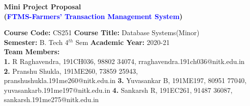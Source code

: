 \documentclass[12pt]{article}
\begin{document}


\begin{center}
    \textbf{\Large{Mini Project Proposal \\
    (\textcolor{blue}{FTMS-Farmers' Transaction Management System})}}
\end{center}

\noindent 
\textbf{Course Code:} CS251 
\hspace{2in} 
\textbf{Course Title:} Database Systems(Minor) \\
\textbf{Semester:} B. Tech 4$^{th}$ Sem 
\hspace{1.6in} 
\textbf{Academic Year:} 2020-21 \\
\hspace{1.8in} 
\textbf{Team Members:} \\
\textbf{1.} R Raghavendra, 191CH036, 98802 34074, rraghavendra.191ch036@nitk.edu.in
\newline
\textbf{2.} Pranshu Shukla, 191ME260, 73859 25943, pranshushukla.191me260@nitk.edu.in
\newline
\textbf{3.} Yuvasankar B, 191ME197,  80951 77040, yuvasankarb.191me197@nitk.edu.in
\newline
\textbf{4.} Sankarsh R, 191EC261, 91487 36087, sankarsh.191me275@nitk.edu.in

\vspace{0.25in}
\end{document}
